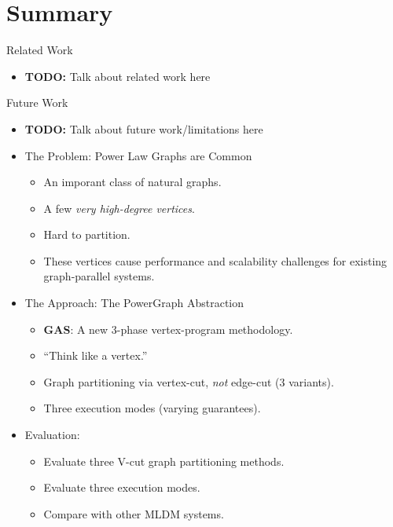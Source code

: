\section*{Summary}

\begin{frame}{Related Work}
  \begin{itemize}
    \item \textbf{TODO:} Talk about related work here
  \end{itemize}
\end{frame}


\begin{frame}{Future Work}
  \begin{itemize}
    \item \textbf{TODO:} Talk about future work/limitations here
  \end{itemize}
\end{frame}


\begin{frame}
\begin{itemize}
  \frametitle{Overview}
  \item The Problem: Power Law Graphs are Common
  \begin{itemize}
    \item An imporant class of natural graphs.
    \item A few \textit{very high-degree vertices}.
    \item Hard to partition.
    \item These vertices cause performance and scalability challenges for
          existing graph-parallel systems.
  \end{itemize}
\end{itemize}
\end{frame}

\begin{frame}
\begin{itemize}
  \frametitle{Overview}
  \item The Approach: The PowerGraph Abstraction
  \begin{itemize}
    \item \textbf{GAS}: A new 3-phase vertex-program methodology.
    \item ``Think like a vertex.'' \citep[SIGMOD '10]{malewicz2010pregel}
    \item Graph partitioning via vertex-cut, \textit{not} edge-cut (3 variants).
    \item Three execution modes (varying guarantees).
  \end{itemize}

  \item Evaluation:
  \begin{itemize}
    \item Evaluate three V-cut graph partitioning methods.
    \item Evaluate three execution modes.
    \item Compare with other MLDM systems.
  \end{itemize}
\end{itemize}
\end{frame}

